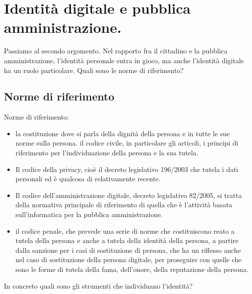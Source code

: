  \section{Identità digitale e pubblica amministrazione.}
 Passiamo al secondo argomento.  Nel rapporto fra il cittadino e la pubblica amministrazione, l'identità personale  entra in gioco, ma anche l'identità digitale ha un ruolo particolare. Quali sono le norme di riferimento?\par
 \subsection{Norme di riferimento}
 Norme di riferimento:
\begin{itemize}
    \item la costituzione dove si parla della dignità della persona e in tutte le sue norme sulla persona. il codice civile, in particolare gli articoli, i principi di riferimento per l'individuazione della persona e la sua tutela. 
     \item Il codice della privacy, cioè il decreto legislativo 196/2003 che tutela i dati personali ed è qualcosa di relativamente recente. 
    \item Il codice dell'amministrazione digitale, decreto legislativo 82/2005, si tratta della normativa principale di riferimento di quella che è l'attività basata sull'informatica per la pubblica amministrazione. 
    \item il codice penale, che prevede una serie di norme che costituiscono reato a tutela della persona e anche a tutela della identità della persona, a partire dalla sanzione per i casi di sostituzione di persona, che ha un riflesso anche nel caso di sostituzione della persona digitale, per proseguire con quelle che sono le forme di tutela della fama, dell'onore, della reputazione della persona.  
\end{itemize}
 
 In concreto quali sono gli strumenti che individuano l'identità? 
 
